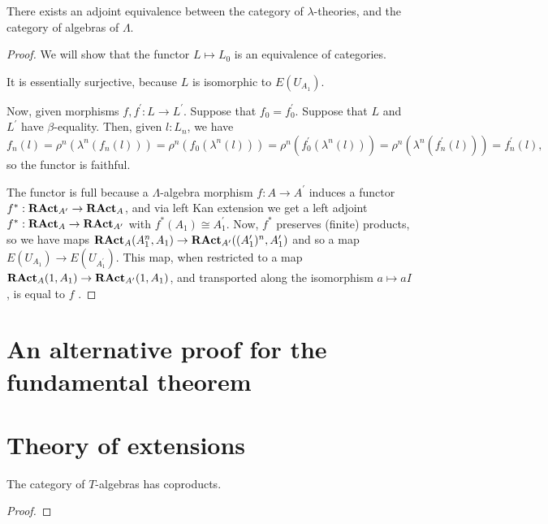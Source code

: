 \begin{theorem}
  There exists an adjoint equivalence between the category of $ \lambda $-theories, and the category of algebras of $ \Lambda $.
\end{theorem}
\begin{proof}
  We will show that the functor $ L \mapsto L_0 $ is an equivalence of categories.

  It is essentially surjective, because $ L $ is isomorphic \TODO to $ E(U_{A_1}) $.

  Now, given morphisms $ f, f^\prime: L \to L^\prime $. Suppose that $ f_0 = f^\prime_0 $. Suppose that $ L $ and $ L^\prime $ have $ \beta $-equality. Then, given $ l: L_n $, we have
  \[ f_n(l) = \rho^n(\lambda^n(f_n(l))) = \rho^n(f_0(\lambda^n(l))) = \rho^n(f^\prime_0(\lambda^n(l))) = \rho^n(\lambda^n(f^\prime_n(l))) = f^\prime_n(l), \]
  so the functor is faithful.

  The functor is full because a $ \Lambda $-algebra morphism $ f: A \to A^\prime $ induces a functor $ f^*: \mathbf{RAct}_{A^\prime} \to \mathbf{RAct}_{A} $, and via left Kan extension we get a left adjoint $ f^*: \mathbf{RAct}_{A} \to \mathbf{RAct}_{A^\prime} $ with $ f^*(A_1) \cong A^\prime_1 $. Now, $ f^* $ preserves (finite) products, so we have maps $ \mathbf{RAct}_{A}(A_1^n, A_1) \to \mathbf{RAct}_{A^\prime}((A^\prime_1)^n, A^\prime_1) $ and so a map $ E(U_{A_1}) \to E(U_{A^\prime_1}) $. This map, when restricted to a map $ \mathbf{RAct}_{A}(1, A_1) \to \mathbf{RAct}_{A^\prime}(1, A_1) $, and transported along the isomorphism $ a \mapsto a I $ \TODO, is equal to $ f $ \TODO.
\end{proof}


\section{An alternative proof for the fundamental theorem}


\section{Theory of extensions}

\begin{lemma}
  The category of $ T $-algebras has coproducts.
\end{lemma}
\begin{proof}
  \TODO
\end{proof}

